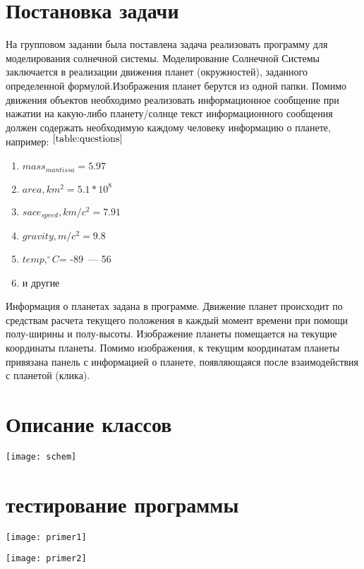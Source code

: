 \documentclass[a4paper,14pt]{extarticle}
\begin{document}

\newpage\section{Постановка задачи}  
На групповом задании была поставлена задача реализовать программу для моделирования солнечной системы. Моделирование Солнечной Системы заключается в реализации движения планет (окружностей), заданного определенной формулой.Изображения планет берутся из одной папки.
Помимо движения объектов необходимо реализовать информационное сообщение при нажатии на какую-либо планету/солнце текст информационного сообщения должен содержать необходимую каждому человеку информацию о планете, например: $^{\ref{table:questions}}$
\begin{enumerate}

 \item ${mass_{mantissa}}= {5.97}$
 \item ${area,km^2}={5.1*10^8}$
 \item ${sace_{speed},km/c^2}={7.91}$
  \item $gravity,m/c^2={9.8}$
  \item  ${temp,^\circ C}$= -89~--- 56 
\item и другие
\end{enumerate}
Информация о планетах задана в программе. Движение планет происходит по средствам расчета текущего положения в каждый момент времени при помощи полу-ширины и полу-высоты. Изображение планеты помещается на текущие координаты планеты. Помимо изображения, к текущим координатам планеты привязана панель с информацией о планете, появляющаяся после взаимодействия с планетой (клика).

\newpage\section{Описание классов} 
\texttt{[image: schem]}


\newpage\section{тестирование программы}  
\texttt{[image: primer1]}

\texttt{[image: primer2]}
\end{document}
